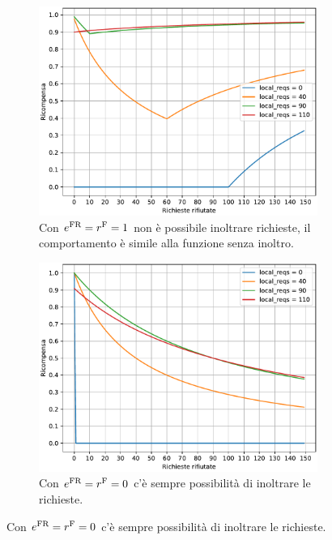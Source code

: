 \begin{figure}
    \centering

    \begin{subfigure}{.6\textwidth}
        \centering
        \includegraphics[width=\linewidth]{assets/4/reward_fw_cant_forward.pdf}
        \caption{Con $e^\textnormal{FR} = r^\textnormal{F} = 1$ non è possibile inoltrare richieste, il comportamento è simile alla funzione senza inoltro.}
        \label{fig:4_reward_fw_cant_forward}
    \end{subfigure}

    \begin{subfigure}{.6\textwidth}
        \centering
        \includegraphics[width=\linewidth]{assets/4/reward_fw_can_forward.pdf}
        \caption{Con $e^\textnormal{FR} = r^\textnormal{F} = 0$ c'è sempre possibilità di inoltrare le richieste.}
        \label{fig:4_reward_fw_can_forward}
    \end{subfigure}


\end{figure}
